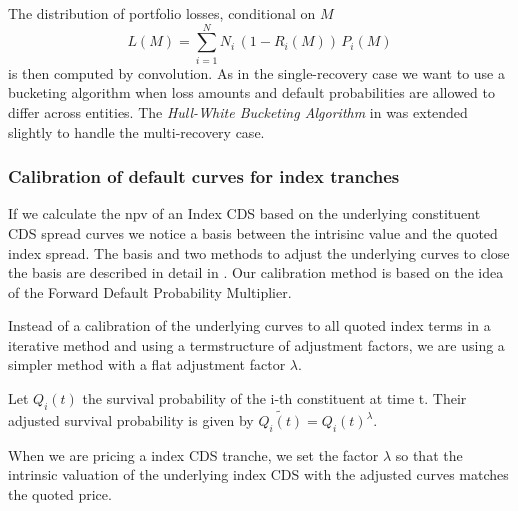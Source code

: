 The distribution of portfolio losses, conditional on $M$
$$
L(M) = \sum_{i=1}^N N_i\,(1-R_i(M))\,P_i(M) 
$$
is then computed by convolution. As in the single-recovery case we want to use a bucketing algorithm when loss amounts and default probabilities are allowed to differ across entities.
The {\em Hull-White Bucketing Algorithm} in \cite{HullWhiteBucketing} was extended slightly to handle the multi-recovery case.

\subsubsection{Calibration of default curves for index tranches}

If we calculate the npv of an Index CDS based on the underlying constituent CDS spread curves we notice a basis between the intrisinc value and the quoted index spread.
The basis and two methods to adjust the underlying curves to close the basis are described in detail in \cite{okane2008}.
Our calibration method is based on the idea of the Forward Default Probability Multiplier.

Instead of a calibration of the underlying curves to all quoted index terms in a iterative method and using a termstructure of adjustment factors, we are using a simpler method with a flat adjustment factor $\lambda$.

Let $Q_i(t)$ the survival probability of the i-th constituent at time t. Their adjusted survival probability is given by $\tilde{Q_i(t)}=Q_i(t)^\lambda$.

When we are pricing a index CDS tranche, we set the factor $\lambda$ so that the intrinsic valuation of the underlying index CDS with the adjusted curves matches the quoted price.




